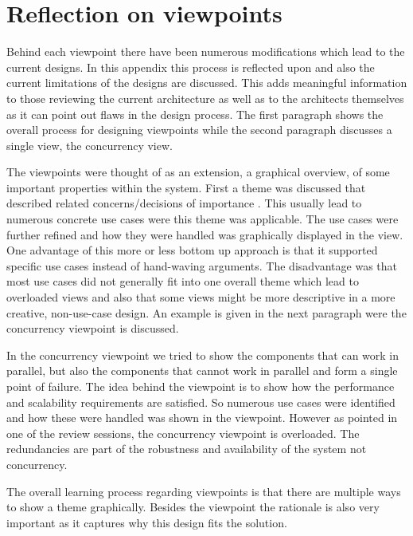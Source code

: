 \section{Reflection on viewpoints}
\label{sec:reflections}
Behind each viewpoint there have been numerous modifications which lead to the current designs. In this appendix this process is reflected upon and also the current limitations of the designs are discussed. This adds meaningful information to those reviewing the current architecture as well as to the architects themselves as it can point out flaws in the design process. The first paragraph shows the overall process for designing viewpoints while the second paragraph discusses a single view, the concurrency view. \newline

The viewpoints were thought of as an extension, a graphical overview, of some important properties within the system. First a theme was discussed that described related concerns/decisions of importance . This usually lead to numerous concrete use cases were this theme was applicable. The use cases were further refined and how they were handled was graphically displayed in the view. One advantage of this more or less bottom up approach is that it supported specific use cases instead of hand-waving arguments. The disadvantage was that most use cases did not generally fit into one overall theme which lead to overloaded views and also that some views might be more descriptive in a more creative, non-use-case design. An example is given in the next paragraph were the concurrency viewpoint is discussed.\newline

In the concurrency viewpoint we tried to show the components that can work in parallel, but also the components that cannot work in parallel and form a single point of failure. The idea behind the viewpoint is to show how the performance and scalability requirements are satisfied. So numerous use cases were identified and how these were handled was shown in the viewpoint. However as pointed in one of the review sessions, the concurrency viewpoint is overloaded. The redundancies are part of the robustness and availability of the system not concurrency. \newline 

The overall learning process regarding viewpoints is that there are multiple ways to show a theme graphically. Besides the viewpoint the rationale is also very important as it captures why this design fits the solution.